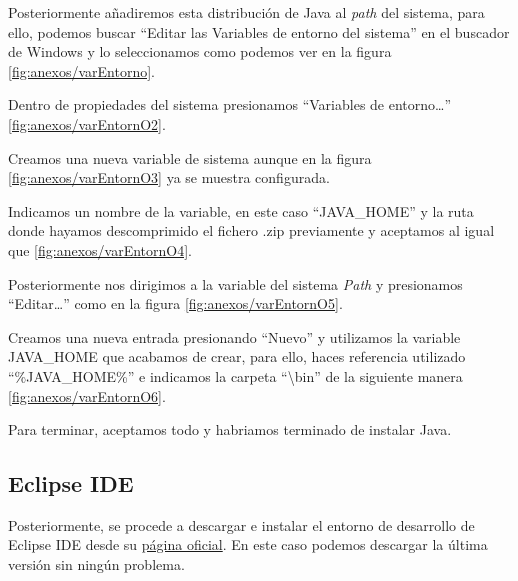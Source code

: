 
Posteriormente añadiremos esta distribución de Java al \emph{path} del sistema, para ello, podemos buscar ``Editar las Variables de entorno del sistema'' en el buscador de Windows y lo seleccionamos como podemos ver en la figura \ref{fig:anexos/varEntorno}.


Dentro de propiedades del sistema presionamos ``Variables de entorno\dots'' \ref{fig:anexos/varEntornO2}.


Creamos una nueva variable de sistema aunque en la figura \ref{fig:anexos/varEntornO3} ya se muestra configurada.


Indicamos un nombre de la variable, en este caso ``JAVA\_HOME'' y la ruta donde hayamos descomprimido el fichero .zip previamente y aceptamos al igual que \ref{fig:anexos/varEntornO4}.


Posteriormente nos dirigimos a la variable del sistema \emph{Path} y presionamos ``Editar\dots'' como en la figura \ref{fig:anexos/varEntornO5}.


Creamos una nueva entrada presionando ``Nuevo'' y utilizamos la variable JAVA\_HOME que acabamos de crear, para ello, haces referencia utilizado ``\%JAVA\_HOME\%'' e indicamos la carpeta ``\textbackslash{}bin'' de la siguiente manera \ref{fig:anexos/varEntornO6}.


Para terminar, aceptamos todo y habriamos terminado de instalar Java.

\subsection{Eclipse IDE}

Posteriormente, se procede a descargar e instalar el entorno de desarrollo de Eclipse IDE desde su \href{https://www.eclipse.org/downloads/packages/}{página oficial}. En este caso podemos descargar la última versión sin ningún problema.

